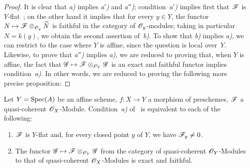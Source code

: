 \begin{proof}
It is clear that \emph{a)} implies \emph{a$'$)} and \emph{a$''$)}; condition~\emph{a$'$)} implies first that $\mathscr{F}$ is $Y$-flat~; on the other hand it implies that for every $y\in Y$, the functor $N\mapsto\mathscr{F}\otimes_{\mathscr{O}_y}\widetilde{N}$ is faithful in the category of $\mathscr{O}_y$-modules; taking in particular $N=k(y)$, we obtain the second assertion of~\emph{b)}.
To show that \emph{b)} implies \emph{a)}, we can restrict to the case where $Y$ is affine, since the question is local over~$Y$.
Likewise, to prove that \emph{a$''$)} implies \emph{a)}, we are reduced to proving that, when $Y$ is affine, the fact that $\mathscr{G}\mapsto\mathscr{F}\otimes_{\mathscr{O}_Y}\mathscr{G}$ is an exact and faithful functor implies condition~\emph{a)}.
In other words, we are reduced to proving the following more precise proposition:
\end{proof}

\begin{proposition}[2.2.2]
\label{IV.2.2.2}
Let $Y=\operatorname{Spec}(A)$ be an affine scheme, $f:X\to Y$ a morphism of preschemes, $\mathscr{F}$ a quasi-coherent $\mathscr{O}_X$-Module.
Condition~\emph{a)} of~ is equivalent to each of the following:
\begin{enumerate}
  \item[\emph{b$'$)}] $\mathscr{F}$ is $Y$-flat and, for every closed point $y$ of $Y$, we have $\mathscr{F}_y\neq 0$.
  \item[\emph{c)}] The functor $\mathscr{G}\mapsto\mathscr{F}\otimes_{\mathscr{O}_Y}\mathscr{G}$ from the category of quasi-coherent $\mathscr{O}_Y$-Modules to that of quasi-coherent $\mathscr{O}_X$-Modules is exact and faithful.
\end{enumerate}
\end{proposition}

